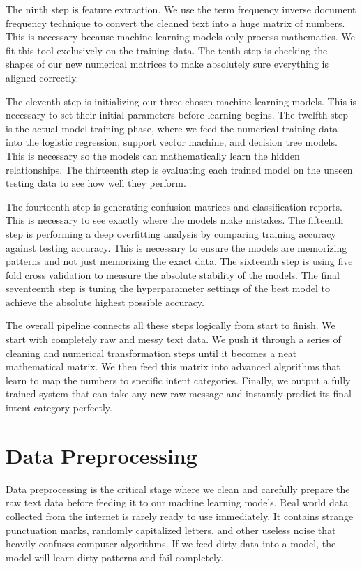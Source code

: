 \documentclass[12pt]{article}
\begin{document}
The ninth step is feature extraction. We use the term frequency inverse document frequency technique to convert the cleaned text into a huge matrix of numbers. This is necessary because machine learning models only process mathematics. We fit this tool exclusively on the training data. The tenth step is checking the shapes of our new numerical matrices to make absolutely sure everything is aligned correctly. 

The eleventh step is initializing our three chosen machine learning models. This is necessary to set their initial parameters before learning begins. The twelfth step is the actual model training phase, where we feed the numerical training data into the logistic regression, support vector machine, and decision tree models. This is necessary so the models can mathematically learn the hidden relationships. The thirteenth step is evaluating each trained model on the unseen testing data to see how well they perform. 

The fourteenth step is generating confusion matrices and classification reports. This is necessary to see exactly where the models make mistakes. The fifteenth step is performing a deep overfitting analysis by comparing training accuracy against testing accuracy. This is necessary to ensure the models are memorizing patterns and not just memorizing the exact data. The sixteenth step is using five fold cross validation to measure the absolute stability of the models. The final seventeenth step is tuning the hyperparameter settings of the best model to achieve the absolute highest possible accuracy. 

The overall pipeline connects all these steps logically from start to finish. We start with completely raw and messy text data. We push it through a series of cleaning and numerical transformation steps until it becomes a neat mathematical matrix. We then feed this matrix into advanced algorithms that learn to map the numbers to specific intent categories. Finally, we output a fully trained system that can take any new raw message and instantly predict its final intent category perfectly.

\section{Data Preprocessing}
Data preprocessing is the critical stage where we clean and carefully prepare the raw text data before feeding it to our machine learning models. Real world data collected from the internet is rarely ready to use immediately. It contains strange punctuation marks, randomly capitalized letters, and other useless noise that heavily confuses computer algorithms. If we feed dirty data into a model, the model will learn dirty patterns and fail completely. 
\end{document}
